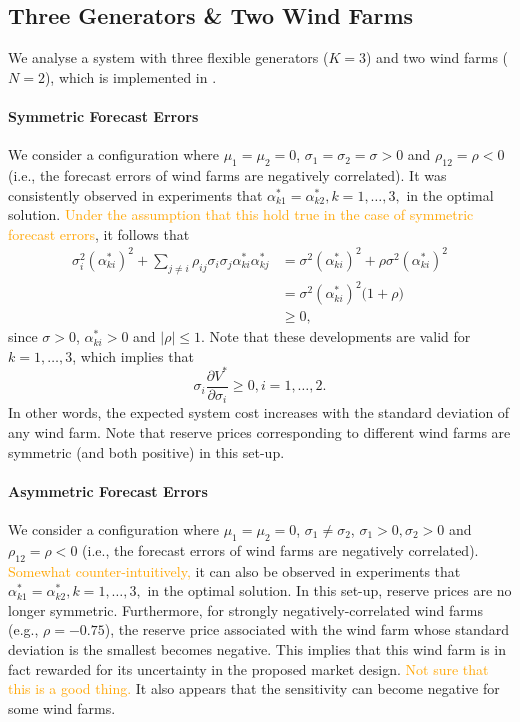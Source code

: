 \documentclass{article}
\begin{document}
\subsection{Three Generators \& Two Wind Farms}

We analyse a system with three flexible generators ($K = 3$) and two wind farms ($N = 2$), which is implemented in \cite{SMER2022}. 

\paragraph{Symmetric Forecast Errors} We consider a configuration where $\mu_1 = \mu_2 = 0$, $\sigma_1 = \sigma_2 = \sigma > 0$ and $\rho_{12} = \rho < 0$ (i.e., the forecast errors of wind farms are negatively correlated). It was consistently observed in experiments that $\alpha_{k1}^* = \alpha_{k2}^*, k = 1, \ldots, 3,$ in the optimal solution. \textcolor{orange}{Under the assumption that this hold true in the case of symmetric forecast errors}, it follows that
\begin{align*}
\sigma_i^2 (\alpha_{ki}^*)^2 + \sum_{j \ne i} \rho_{ij} \sigma_i \sigma_j \alpha_{ki}^* \alpha_{kj}^* &= \sigma^2 (\alpha_{ki}^*)^2 + \rho \sigma^2 (\alpha_{ki}^*)^2\\
&= \sigma^2 (\alpha_{ki}^*)^2 \big(1 + \rho\big)\\
&\ge 0,
\end{align*}
since $\sigma > 0$, $\alpha_{ki}^* > 0$ and $|\rho| \le 1$. Note that these developments are valid for $k = 1, \ldots, 3$, which implies that 
\begin{equation*}
\sigma_i \frac{\partial V^*}{\partial \sigma_i} \ge 0, i = 1, \ldots, 2.
\end{equation*}
In other words, the expected system cost increases with the standard deviation of any wind farm. Note that reserve prices corresponding to different wind farms are symmetric (and both positive) in this set-up.

\paragraph{Asymmetric Forecast Errors} We consider a configuration where $\mu_1 = \mu_2 = 0$, $\sigma_1 \ne \sigma_2$, $\sigma_1 > 0, \sigma_2 > 0$ and $\rho_{12} = \rho < 0$ (i.e., the forecast errors of wind farms are negatively correlated). \textcolor{orange}{Somewhat counter-intuitively,} it can also be observed in experiments that $\alpha_{k1}^* = \alpha_{k2}^*, k = 1, \ldots, 3,$ in the optimal solution. In this set-up, reserve prices are no longer symmetric. Furthermore, for strongly negatively-correlated wind farms (e.g., $\rho = -0.75$), the reserve price associated with the wind farm whose standard deviation is the smallest becomes negative. This implies that this wind farm is in fact rewarded for its uncertainty in the proposed market design. \textcolor{orange}{Not sure that this is a good thing.} It also appears that the sensitivity can become negative for some wind farms.
\end{document}

